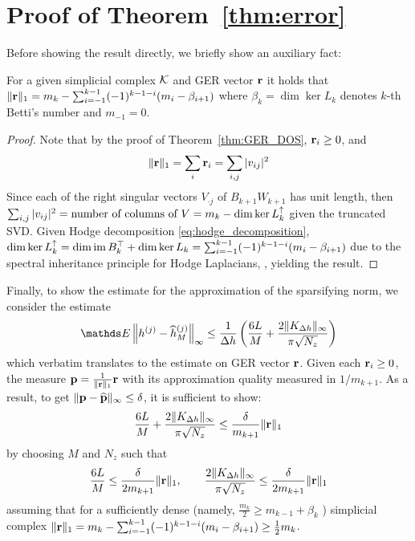 \section{Proof of Theorem~\ref{thm:error}}

Before showing the result directly, we briefly show an auxiliary fact:
\begin{lemma}
  For a given simplicial complex \( \mathcal{K} \) and GER vector \( \mathbf{r} \) it holds that \( \| \mathbf{r} \|_1 = m_{k} - \sum_{i=-1}^{k-1} (-1)^{k-1-i} ( m_i - \beta_{i+1} ) \) where \( \beta_k = \dim \ker L_k \) denotes \( k\)-th Betti's number and \( m_{-1} = 0 \).
\end{lemma}
\begin{proof}
      Note that by the proof of Theorem~\ref{thm:GER_DOS}, \( \mathbf{r}_i \ge 0 \), and
      \begin{equation}
            \| \mathbf{r} \|_1 = \sum_i \mathbf{r}_i = \sum_{i, j} | v_{ij} |^2
      \end{equation}
      Since each of the right singular vectors \( V_{ \cdot j} \) of \( B_{k+1} W_{k+1}\) has unit length, then \( \sum_{i, j} | v_{ij} |^2 = \text{number of columns of } V = m_k - \dim \ker L_{k}^{\uparrow} \)  given the truncated SVD. Given Hodge decomposition \eqref{eq:hodge_decomposition}, \( \dim \ker L_{k}^{\uparrow} = \dim \operatorname{im} B_k^\top + \dim \ker L_k = \sum_{i=-1}^{k-1} (-1)^{k-1-i} ( m_i - \beta_{i+1} )\) due to the spectral inheritance principle for Hodge Laplacians, \cite{guglielmi2023quantifying}, yielding the result. 
\end{proof}

Finally, to show the estimate for the approximation of the sparsifying norm, we consider the estimate 
\begin{equation}
      \ds E \left\| h^{(j)} - \wh h^{(j)}_M \right\|_\infty \le \frac{1}{\Delta h} \left( \frac{6L}{M} + \frac{2 \| K_{\Delta h} \|_\infty}{\pi \sqrt{N_z}} \right)
\end{equation}
which verbatim translates to the estimate on GER vector \( \mathbf{r}\). Given each \( \mathbf{r}_i \ge  0\), the measure \( \mathbf{p} = \frac{1}{\| \mathbf{r} \|_1} \mathbf{r} \) with its approximation quality measured in \( 1/m_{k+1}\). As a result, to get \( \| \mathbf{p} - \widehat{ \mathbf{p}} \|_\infty \le \delta \), it is sufficient to show:
\begin{equation}
      \frac{6L}{M} + \frac{2 \| K_{\Delta h} \|_\infty}{\pi \sqrt{N_z}} \le \frac{\delta}{m_{k+1}} \| \mathbf{r} \|_1 
\end{equation}
by choosing \( M \) and \( N_z \) such that 
\begin{equation}
      \frac{6L}{M} \le \frac{\delta}{2m_{k+1}} \| \mathbf{r} \|_1 , \qquad \frac{2 \| K_{\Delta h} \|_\infty}{\pi \sqrt{N_z}} \le \frac{\delta}{2m_{k+1}}\| \mathbf{r} \|_1
\end{equation}
assuming that for a sufficiently dense (namely, \( \frac{m_k}{2} \ge m_{k-1} + \beta_k \) ) simplicial complex \( \| \mathbf{r} \|_1 = m_{k} -\sum_{i=-1}^{k-1} (-1)^{k-1-i} ( m_i - \beta_{i+1} ) \ge \frac{1}{2}m_{k}\).


